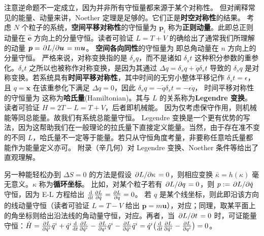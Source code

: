 注意逆命题不一定成立，因为并非所有守恒量都来源于某个对称性。
但对阐释常见的能量、动量来讲，Noether 定理是足够的。它们正是\textbf{时空对称性}的结果。
考虑 $N$ 个粒子的系统，\textbf{空间平移对称性}的守恒量为
$\bm p_i$ 称为\textbf{正则动量}。此即总正则动量在 $\hat{\bm e}$ 方向上的分量守恒。读者可验证 $L=T+V$ 的确给出了通常我们所理解的动量 $\vb* p=\pdv*{L}{\vb* u}=m\vb* u$。
\textbf{空间各向同性}的守恒量为
即总角动量在 $n$ 方向上的分量守恒。
严格来说，对称变换指的是 $\delta_s q$，而不是诸如 $\delta_s t$ 这种积分参数的重参化。$\delta_s t$ 之所以也被称作对称变换，是因为其通过 $\Delta q=\delta_s q+\dot q\delta_s t$ 导致的 $\delta_s q$ 是对称变换。若系统具有\textbf{时间平移对称性}，其中时间的无穷小整体平移记作 $\delta_s t=\epsilon$，且 $q=\bm x$ 在该重参化下满足 $\Delta q=0$，因此 $\delta_s q=-\dot q\delta_s t=-\epsilon\dot q$，
时间平移对称性的守恒量为
这称为\textbf{哈氏量}(Hamiltonian)。其与 $L$ 的关系称为\textbf{Legendre 变换}。
读者可验证 $H=2T-L=T+V$，后者即机械能。
因为仅考虑保守作用，则机械能等同总能量。故我们有系统总能量守恒。
Legendre 变换是一个更有优势的写法，因为这帮助我们在一般理论的拉氏量下直接定义能量。当然，由于存在准不变的不同 $L$，哈氏量不一定等于能量。若只从守恒角度考量，非要称任意哈氏量都能作为能量定义亦可。
附录（辛几何）对 Legendre 变换、Noether 条件等给出了直观理解。

另一种能轻松办到 $\Delta S=0$ 的方法是假设 $\pdv*{L}{\kappa}=0$，则相应变换 $\bar\kappa=h(\kappa)$ 毫无意义。$\kappa$ 称为\textbf{循环坐标}。
比如，对某个粒子若有 $\pdv*{L}{q}=0$，则 $p:=\pdv*{L}{\dot{q}}$ 守恒，因为 E-L 方程给出 $\dv{t} \pdv{L}{\dot q}=\pdv{L}{q}=0$。
若 $q$ 是某个线坐标，则此即沿该方向的线动量守恒（读者可验证 $L=T-V$ 给出 $\bm p=m\bm u$），对应；同理，取某平面上的角坐标则给出沿法线的角动量守恒，对应。再者，当 $\pdv*{L}{t}=0$ 时，可证能量守恒：$\dot H=\pdv{L}{\dot q^i}\ddot q^i+\dot q^i\dv{t}\pdv{L}{\dot q^i}-\pdv{L}{q^i}\dot q^i-\pdv{L}{\dot q^i}\ddot q^i=\dot q^i\big(\dv{t}\pdv{L}{\dot q^i}-\pdv{L}{q^i}\big)=0$。

